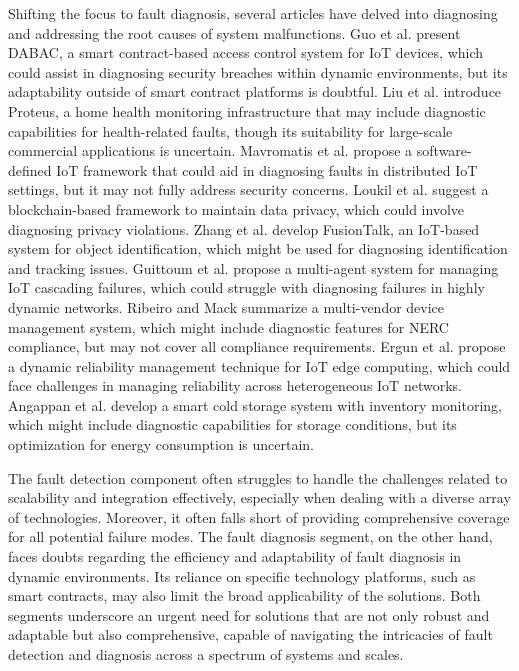 \documentclass[preprint,12pt]{elsarticle}
\begin{document}
Shifting the focus to fault diagnosis, several articles have delved into diagnosing and addressing the root causes of system malfunctions. Guo et al. \cite{Guo202336452} present DABAC, a smart contract-based access control system for IoT devices, which could assist in diagnosing security breaches within dynamic environments, but its adaptability outside of smart contract platforms is doubtful. Liu et al. \cite{Liu2024} introduce Proteus, a home health monitoring infrastructure that may include diagnostic capabilities for health-related faults, though its suitability for large-scale commercial applications is uncertain. Mavromatis et al. \cite{Mavromatis20201718} propose a software-defined IoT framework that could aid in diagnosing faults in distributed IoT settings, but it may not fully address security concerns. Loukil et al. \cite{Loukil2021} suggest a blockchain-based framework to maintain data privacy, which could involve diagnosing privacy violations. Zhang et al. \cite{Zhang20217333} develop FusionTalk, an IoT-based system for object identification, which might be used for diagnosing identification and tracking issues. Guittoum et al. \cite{Guittoum2023325} propose a multi-agent system for managing IoT cascading failures, which could struggle with diagnosing failures in highly dynamic networks. Ribeiro and Mack \cite{Ribiero202265} summarize a multi-vendor device management system, which might include diagnostic features for NERC compliance, but may not cover all compliance requirements. Ergun et al. \cite{Ergun20233864} propose a dynamic reliability management technique for IoT edge computing, which could face challenges in managing reliability across heterogeneous IoT networks. Angappan et al. \cite{Angappan202589} develop a smart cold storage system with inventory monitoring, which might include diagnostic capabilities for storage conditions, but its optimization for energy consumption is uncertain.





The fault detection component often struggles to handle the challenges related to scalability and integration effectively, especially when dealing with a diverse array of technologies. Moreover, it often falls short of providing comprehensive coverage for all potential failure modes. The fault diagnosis segment, on the other hand, faces doubts regarding the efficiency and adaptability of fault diagnosis in dynamic environments. Its reliance on specific technology platforms, such as smart contracts, may also limit the broad applicability of the solutions. Both segments underscore an urgent need for solutions that are not only robust and adaptable but also comprehensive, capable of navigating the intricacies of fault detection and diagnosis across a spectrum of systems and scales.
\end{document}
